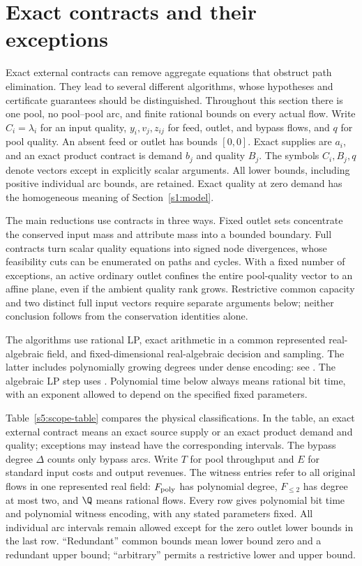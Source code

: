 \section{Exact contracts and their exceptions}\label{s5:contracts}

Exact external contracts can remove aggregate equations that obstruct
path elimination. They lead to several different algorithms, whose
hypotheses and certificate guarantees should be distinguished. Throughout
this section there is one pool, no pool--pool arc, and finite rational
bounds on every actual flow. Write $C_i=\lambda_i$ for an input quality,
$y_i,v_j,z_{ij}$ for feed, outlet, and bypass flows, and $q$ for pool
quality. An absent feed or outlet has bounds $[0,0]$. Exact supplies are
$a_i$, and an exact product contract is demand $b_j$ and quality $B_j$.
The symbols $C_i,B_j,q$ denote vectors except in explicitly scalar
arguments. All lower bounds, including positive individual arc bounds,
are retained. Exact quality at zero demand has the homogeneous meaning
of Section~\ref{s1:model}.

The main reductions use contracts in three ways. Fixed outlet sets
concentrate the conserved input mass and attribute mass into a bounded
boundary. Full contracts turn scalar quality equations into signed
node divergences, whose feasibility cuts can be enumerated on paths
and cycles. With a fixed number of exceptions, an active ordinary
outlet confines the entire pool-quality vector to an affine plane,
even if the ambient quality rank grows. Restrictive common capacity
and two distinct full input vectors require separate arguments below;
neither conclusion follows from the conservation identities alone.

The algorithms use rational LP, exact arithmetic in a common represented
real-algebraic field, and fixed-dimensional real-algebraic decision and
sampling. The latter includes polynomially growing degrees under dense
encoding: see \citet[Theorem~1.3.1 and Sections~3.1.3--3.2]
{basu1996-on-the-combinatorial-and-algebraic}. The algebraic LP step uses
\citet[Section~5, Remark~1]{s4:adler1994}. Polynomial time below always
means rational bit time, with an exponent allowed to depend on the
specified fixed parameters.

Table~\ref{s5:scope-table} compares the physical classifications. In the
table, an exact external contract means an exact source supply or an
exact product demand and quality; exceptions may instead have the
corresponding intervals. The bypass degree $\Delta$ counts only bypass
arcs. Write $T$ for pool throughput and $E$ for standard input costs
and output revenues. The witness entries refer to all original flows
in one represented real field: $F_{\rm poly}$ has polynomial degree,
$F_{\le2}$ has degree at most two, and $\Q$ means rational flows.
Every row gives polynomial bit time and polynomial witness encoding,
with any stated parameters fixed. All individual arc intervals remain
allowed except for the zero outlet lower bounds in the last row.
``Redundant'' common bounds mean lower bound zero and a redundant upper
bound; ``arbitrary'' permits a restrictive lower and upper bound.

